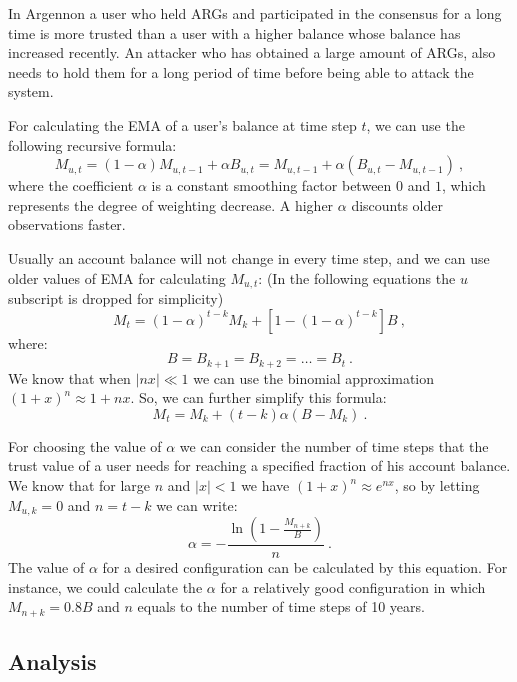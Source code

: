 In Argennon a user who held ARGs and participated in the consensus for a long time is more trusted
than a user with a higher balance whose balance has increased recently. An attacker who has obtained a large
amount of ARGs, also needs to hold them for a long period of time before being able to attack the system.

For calculating the EMA of a user's balance at time step \(t\), we can use the following
recursive formula:
\[
    M_{u,t} = (1 - \alpha) M_{u,t-1} + \alpha B_{u,t} = M_{u,t-1} + \alpha (B_{u,t} - M_{u,t-1})\ ,
\]
where the coefficient \(\alpha\) is a constant smoothing factor between \(0\) and \(1\), which represents the
degree of weighting decrease. A higher \(\alpha\) discounts older observations faster.

Usually an account balance will not change in every time step, and we can use older values of EMA for calculating
\(M_{u,t}\): (In the following equations the \(u\) subscript is dropped for simplicity)
\[
    M_{t} = (1 - \alpha)^{t-k}M_{k} + [1 - (1 - \alpha)^{t - k}]B\ ,
\]
where:
\[
    B = B_{k+1} = B_{k+2} = \dots = B_{t}\ .
\]
We know that when \(|nx| \ll 1\) we can use the binomial approximation \({(1 + x)^n \approx 1 + nx}\). So, we can
further simplify this formula:
\[
    M_{t} = M_{k} + (t - k) \alpha (B - M_{k})\ .
\]

For choosing the value of \(\alpha\) we can consider the number of time steps that the trust value of a user needs
for reaching a specified fraction of his account balance. We know that for large \(n\) and \(|x| < 1\) we have
\((1 + x)^n \approx e^{nx}\), so by letting \(M_{u,k} = 0\) and \(n = t - k\) we can write:
\begin{equation}
    \alpha =- \frac{\ln\left(1 - \frac{M_{n+k}}{B}\right)}{n}\ .\label{eq:alpha}
\end{equation}
The value of \(\alpha\) for a desired configuration can be calculated by this equation. For instance, we could
calculate the \(\alpha\) for a relatively good configuration in which \(M_{n+k} = 0.8B\) and \(n\) equals to the
number of time steps of 10 years.

\subsection{Analysis}\label{subsec:consensus-math}
